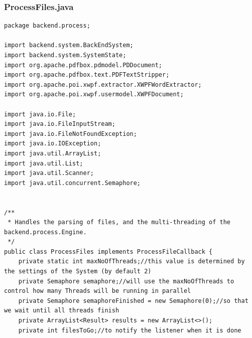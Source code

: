 \subsubsection{ProcessFiles.java}
\begin{lstlisting}
package backend.process;

import backend.system.BackEndSystem;
import backend.system.SystemState;
import org.apache.pdfbox.pdmodel.PDDocument;
import org.apache.pdfbox.text.PDFTextStripper;
import org.apache.poi.xwpf.extractor.XWPFWordExtractor;
import org.apache.poi.xwpf.usermodel.XWPFDocument;

import java.io.File;
import java.io.FileInputStream;
import java.io.FileNotFoundException;
import java.io.IOException;
import java.util.ArrayList;
import java.util.List;
import java.util.Scanner;
import java.util.concurrent.Semaphore;


/**
 * Handles the parsing of files, and the multi-threading of the backend.process.Engine.
 */
public class ProcessFiles implements ProcessFileCallback {
    private static int maxNoOfThreads;//this value is determined by the settings of the System (by default 2)
    private Semaphore semaphore;//will use the maxNoOfThreads to control how many Threads will be running in parallel
    private Semaphore semaphoreFinished = new Semaphore(0);//so that we wait until all threads finish
    private ArrayList<Result> results = new ArrayList<>();
    private int filesToGo;//to notify the listener when it is done


\end{lstlisting}
